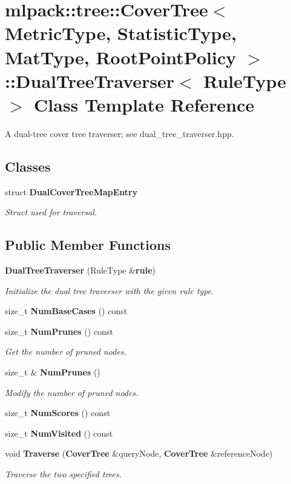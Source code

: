 \section{mlpack\+:\+:tree\+:\+:Cover\+Tree$<$ Metric\+Type, Statistic\+Type, Mat\+Type, Root\+Point\+Policy $>$\+:\+:Dual\+Tree\+Traverser$<$ Rule\+Type $>$ Class Template Reference}
\label{classmlpack_1_1tree_1_1CoverTree_1_1DualTreeTraverser}


A dual-\/tree cover tree traverser; see dual\+\_\+tree\+\_\+traverser.\+hpp.  


\subsection*{Classes}
\begin{DoxyCompactItemize}
\item 
struct {\bf Dual\+Cover\+Tree\+Map\+Entry}
\begin{DoxyCompactList}\small\item\em Struct used for traversal. \end{DoxyCompactList}\end{DoxyCompactItemize}
\subsection*{Public Member Functions}
\begin{DoxyCompactItemize}
\item 
{\bf Dual\+Tree\+Traverser} (Rule\+Type \&{\bf rule})
\begin{DoxyCompactList}\small\item\em Initialize the dual tree traverser with the given rule type. \end{DoxyCompactList}\item 
size\+\_\+t {\bf Num\+Base\+Cases} () const 
\item 
size\+\_\+t {\bf Num\+Prunes} () const 
\begin{DoxyCompactList}\small\item\em Get the number of pruned nodes. \end{DoxyCompactList}\item 
size\+\_\+t \& {\bf Num\+Prunes} ()
\begin{DoxyCompactList}\small\item\em Modify the number of pruned nodes. \end{DoxyCompactList}\item 
size\+\_\+t {\bf Num\+Scores} () const 
\item 
size\+\_\+t {\bf Num\+Visited} () const 
\item 
void {\bf Traverse} ({\bf Cover\+Tree} \&query\+Node, {\bf Cover\+Tree} \&reference\+Node)
\begin{DoxyCompactList}\small\item\em Traverse the two specified trees. \end{DoxyCompactList}\end{DoxyCompactItemize}
